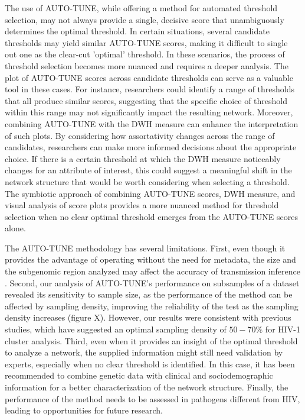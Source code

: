 \documentclass[utf8]{FrontiersinHarvard} %
\begin{document}
The use of AUTO-TUNE, while offering a method for automated threshold
selection, may not always provide a single, decisive score that unambiguously
determines the optimal threshold. In certain situations, several candidate
thresholds may yield similar AUTO-TUNE scores, making it difficult to single
out one as the clear-cut 'optimal' threshold. In these scenarios, the process
of threshold selection becomes more nuanced and requires a deeper analysis. The
plot of AUTO-TUNE scores across candidate thresholds can serve as a valuable
tool in these cases. For instance, researchers could identify a range of
thresholds that all produce similar scores, suggesting that the specific choice
of threshold within this range may not significantly impact the resulting
network. Moreover, combining AUTO-TUNE with the DWH measure can enhance the
interpretation of such plots. By considering how assortativity changes across
the range of candidates, researchers can make more informed decisions about the
appropriate choice. If there is a certain threshold at which the DWH measure
noticeably changes for an attribute of interest, this could suggest a
meaningful shift in the network structure that would be worth considering when
selecting a threshold. The symbiotic approach of combining AUTO-TUNE scores,
DWH measure, and visual analysis of score plots provides a more nuanced method
for threshold selection when no clear optimal threshold emerges from the
AUTO-TUNE scores alone. 

The AUTO-TUNE methodology has several limitations. First, even though it
provides the advantage of operating without the need for metadata, the size and
the subgenomic region analyzed may affect the accuracy of transmission
inference \cite{junqueira_factors_2019}. Second, our analysis of AUTO-TUNE's
performance on subsamples of a dataset revealed its sensitivity to sample size,
as the performance of the method can be affected by sampling density, improving
the reliability of the test as the sampling density increases (figure X).
However, our results were consistent with previous studies, which have
suggested an optimal sampling density of $50-70\%$ for HIV-1 cluster
analysis\cite{novitsky_impact_2014}. Third, even when it provides an insight of
the optimal threshold to analyze a network, the supplied information might
still need validation by experts, especially when no clear threshold is
identified. In this case, it has been recommended to combine genetic data with
clinical and sociodemographic information for a better characterization of the
network structure. Finally, the performance of the method needs to be assessed
in pathogens different from HIV, leading to opportunities for future research.
\end{document}
